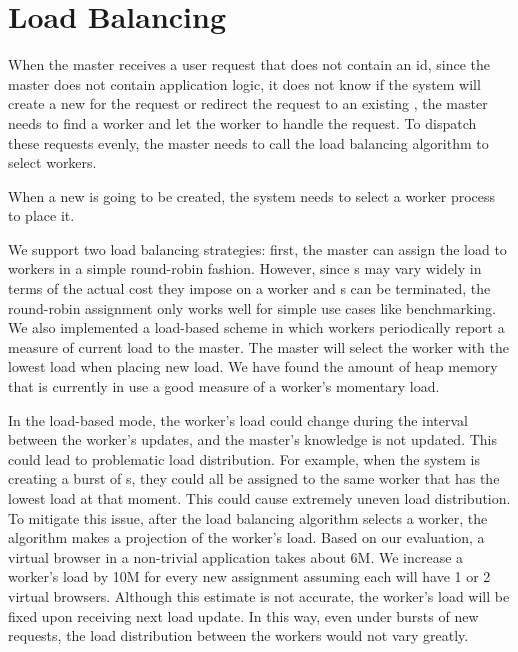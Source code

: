 \section{Load Balancing}
\label{sec:lb}



When the master receives a user request that does not contain an \appins id,
since the master does not contain application logic,
it does not know if the system will create a new \appins{} for
the request or redirect the request to an existing \appins{},
the master needs to find a worker and let the worker to handle 
the request.
To dispatch these requests evenly, the master needs to call the load
balancing algorithm to select workers.

When a new \appins{} is going to be created,
the system needs to select a worker process to place it.



We support two load balancing strategies: first, the master can assign the
load to workers in a simple round-robin fashion. However, since \appins{}s may
vary widely in terms of the actual cost they impose on a worker and \appins{}s
can be terminated,  the round-robin assignment only works well for simple use
cases like benchmarking. We also implemented a load-based scheme in which
workers periodically report a measure of current load to the master. The
master will select the worker with the lowest load when placing new load.  We
have found the amount of heap memory that is currently in use a good measure
of a worker's  momentary load.

In the load-based mode,  the worker's load could change during the interval
between the worker's updates, and the master's knowledge is not updated. This
could lead to problematic load distribution. For example,  when the system is
creating a burst of \appins{}s, they could all be assigned to the same worker
that has the lowest load at that moment.  This could cause extremely uneven
load distribution. To mitigate this issue,  after the load balancing algorithm
selects a worker, the algorithm makes a projection of the worker's load. Based
on our evaluation, a virtual browser in a non-trivial application takes about
6M.  We increase a worker's load by 10M for every new \appins assignment
assuming each \appins will have 1 or 2  virtual browsers. Although this
estimate is not accurate, the worker's load will be fixed upon receiving next
load update. In this way, even under bursts of new requests,  the load
distribution between the workers would not vary greatly.



